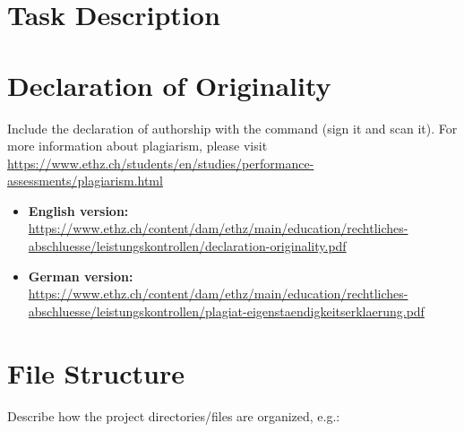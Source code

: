 
\chapter{Task Description}



\chapter{Declaration of Originality}\label{chap:originality}
Include the declaration of authorship with the  command (sign it and scan it). For more information
about plagiarism, please visit
\url{https://www.ethz.ch/students/en/studies/performance-assessments/plagiarism.html}

\begin{itemize}
\item \textbf{English version:}
  \url{https://www.ethz.ch/content/dam/ethz/main/education/rechtliches-abschluesse/leistungskontrollen/declaration-originality.pdf}
\item \textbf{German version:}
  \url{https://www.ethz.ch/content/dam/ethz/main/education/rechtliches-abschluesse/leistungskontrollen/plagiat-eigenstaendigkeitserklaerung.pdf}
\end{itemize}




\chapter{File Structure}
Describe how the project directories/files are organized, e.g.:

